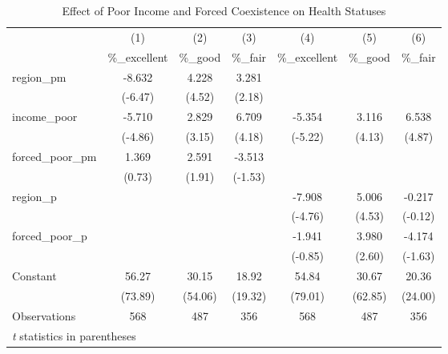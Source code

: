 \documentclass[12pt]{article}
\begin{document}
\begin{table}[htbp]\centering \caption{Effect of Poor Income and Forced Coexistence on Health Statuses\label{poorfc}} \begin{tabular}{l*{6}{c}} \toprule
                    &\multicolumn{1}{c}{(1)}&\multicolumn{1}{c}{(2)}&\multicolumn{1}{c}{(3)}&\multicolumn{1}{c}{(4)}&\multicolumn{1}{c}{(5)}&\multicolumn{1}{c}{(6)}\\
                    &\multicolumn{1}{c}{\%\_excellent}&\multicolumn{1}{c}{\%\_good}&\multicolumn{1}{c}{\%\_fair}&\multicolumn{1}{c}{\%\_excellent}&\multicolumn{1}{c}{\%\_good}&\multicolumn{1}{c}{\%\_fair}\\
\midrule
region\_pm           &      -8.632&       4.228&       3.281&            &            &            \\
                    &     (-6.47)&      (4.52)&      (2.18)&            &            &            \\
\addlinespace
income\_poor         &      -5.710&       2.829&       6.709&      -5.354&       3.116&       6.538\\
                    &     (-4.86)&      (3.15)&      (4.18)&     (-5.22)&      (4.13)&      (4.87)\\
\addlinespace
forced\_poor\_pm      &       1.369&       2.591&      -3.513&            &            &            \\
                    &      (0.73)&      (1.91)&     (-1.53)&            &            &            \\
\addlinespace
region\_p            &            &            &            &      -7.908&       5.006&      -0.217\\
                    &            &            &            &     (-4.76)&      (4.53)&     (-0.12)\\
\addlinespace
forced\_poor\_p       &            &            &            &      -1.941&       3.980&      -4.174\\
                    &            &            &            &     (-0.85)&      (2.60)&     (-1.63)\\
\addlinespace
Constant            &       56.27&       30.15&       18.92&       54.84&       30.67&       20.36\\
                    &     (73.89)&     (54.06)&     (19.32)&     (79.01)&     (62.85)&     (24.00)\\
\midrule
Observations        &         568&         487&         356&         568&         487&         356\\
\bottomrule
\multicolumn{7}{l}{\footnotesize \textit{t} statistics in parentheses}\\
\end{tabular}
\end{table}
\end{document}
